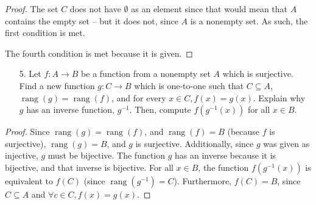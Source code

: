 \documentclass[10pt]{article}
\theoremstyle{definition}
\theoremstyle{plain}
\DeclareMathOperator\rang{rang}
\begin{document}
\begin{proof}
  The set $C$ does not have $\emptyset$ as an element since that would mean that $A$ contains the empty set -- but it does not, since $A$ is a nonempty set. As such, the first condition is met.



  The fourth condition is met because it is given.
\end{proof}



\pagebreak



\begin{enumerate}
\item[5.] Let $f:A \to B$ be a function from a nonempty set $A$ which is surjective.  Find a new function $g:C \to B$ which is one-to-one such that $C \subseteq A$, $\rang(g) = \rang(f)$, and for every $x \in C, f(x) = g(x)$.  Explain why $g$ has an inverse function, $g^{-1}$.  Then, compute $f(g^{-1}(x))$ for all $x \in B$.
\end{enumerate}



\begin{proof}
  Since $\rang(g) = \rang(f)$, and $\rang(f) = B$ (because $f$ is surjective), $\rang(g) = B$, and $g$ is surjective. Additionally, since $g$ was given as injective, $g$ must be bijective. The function $g$ has an inverse because it is bijective, and that inverse is bijective. For all $x \in B$, the function $f(g^{-1}(x))$ is equivalent to $f(C)$ (since $\rang(g^{-1}) = C$). Furthermore, $f(C)=B$, since $C\subseteq A$ and $\forall c\in C, f(x)=g(x)$.
\end{proof}
\end{document}
